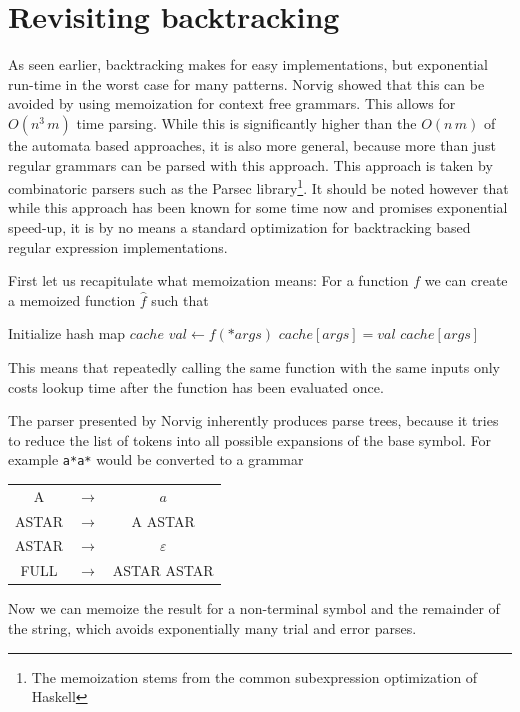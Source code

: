 \documentclass[11pt,a4paper,twoside,openright]{Thesis}
\theoremstyle{definition}
\newcommand{\seclabel}[1]{\label{sec:#1}}
\begin{document}
\section{Revisiting backtracking}\seclabel{revise-backtrack}
As seen earlier, backtracking makes for easy implementations, but exponential
run-time in the worst case for many patterns. Norvig\cite{Norv91a} showed that
this can be avoided by using memoization for context free grammars.  This
allows for $O(n^3\, m)$ time parsing. While this is significantly higher than
the $O(n\, m)$ of the automata based approaches, it is also more general,
because more than just regular grammars can be parsed with this approach.  This
approach is taken by combinatoric parsers such as the Parsec
library\footnote{The memoization stems from the common subexpression
optimization of Haskell}.  It should be noted however that while this
approach has been known for some time now and promises exponential
speed-up, it is by no means a standard optimization for backtracking based
regular expression implementations.

First let us recapitulate what memoization means: For a function $f$ we can
create a memoized function $\hat f$ such that
\begin{algorithmic}
  \State Initialize hash map $cache$
  \State $val\leftarrow f(*args)$
  \State $cache[args] = val$
  \EndIf
  \State \Return $cache[args]$
  \EndFunction
\end{algorithmic}
This means that repeatedly calling the same function with  the same inputs
only costs lookup time after the function has been evaluated once.

The parser presented by Norvig inherently produces parse trees, because it
tries to reduce the list of tokens into all possible expansions of the base
symbol. For example \texttt{a*a*} would be converted to a grammar

\begin{center}
\begin{tabular}{ccc}
A& $\rightarrow$ & $a$\\
ASTAR & $\rightarrow$ & A ASTAR \\
ASTAR & $\rightarrow$ & $\varepsilon$ \\
FULL & $\rightarrow$ & ASTAR ASTAR \\
\end{tabular}
\end{center}

Now we can memoize the result for a non-terminal symbol and the remainder of
the string, which avoids exponentially many trial and error parses.
\end{document}
